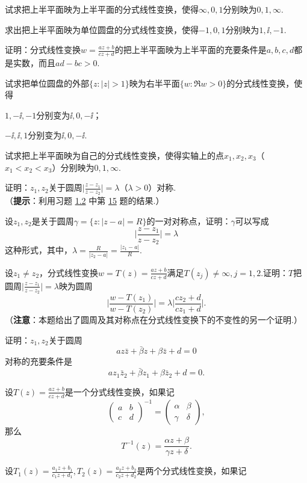 \begin{xiti}
\item 试求把上半平面映为上半平面的分式线性变换，使得$\infty,0,1$分别映为$0,1,\infty$.
\item 求出把上半平面映为单位圆盘的分式线性变换，使得$-1,0,1$分别映为$1,\ii,-1$.
\item 证明：分式线性变换$w=\frac{az+b}{cz+d}$的把上半平面映为上半平面的充要条件是$a,b,c,d$都是实数，而且$ad-bc>0$.
\item 试求把单位圆盘的外部$\{z:|z|>1\}$映为右半平面$\{w:\Re w>0\}$的分式线性变换，使得
\begin{enuma}
  \item $1,-\ii,-1$分别变为$\ii,0,-\ii$；
  \item $-\ii,\ii,1$分别变为$\ii,0,-\ii$.
\end{enuma}
\item 试求把上半平面映为自己的分式线性变换，使得实轴上的点$x_1,x_2,x_3$（$x_1<x_2<x_3$）分别映为$0,1,\infty$.
\item 证明：$z_1,z_2$关于圆周$\bigg|\frac{z-z_1}{z-z_2}\bigg|=\lambda$（$\lambda>0$）对称.\\
（\textbf{提示}：利用习题 \hyperlink{xiti1.2}{1.2} 中第 \hyperlink{xiti1.2.15}{15} 题的结果.）
\item 设$z_1,z_2$是关于圆周$\gamma=\{z:|z-a|=R\}$的一对对称点，证明：$\gamma$可以写成
\[\bigg|\frac{z-z_1}{z-z_2}\bigg|=\lambda\]
这种形式，其中，$\lambda=\frac R{|z_2-a|}=\frac{|z_1-a|}R$.
\item 设$z_1\ne z_2$，分式线性变换$w=T(z)=\frac{az+b}{cz+d}$满足$T(z_j)\ne\infty,j=1,2$.证明：$T$把圆周$\bigg|\frac{z-z_1}{z-z_2}\bigg|=\lambda$映为圆周
    \[\bigg|\frac{w-T(z_1)}{w-T(z_2)}\bigg|=\lambda\bigg|\frac{cz_2+d}{cz_1+d}\bigg|.\]
（\textbf{注意}：本题给出了圆周及其对称点在分式线性变换下的不变性的另一个证明.）
\item 证明：$z_1,z_2$关于圆周
\[az\bar z+\bar \beta z+\beta\bar z+d=0\]
对称的充要条件是
\[az_1\bar z_2+\bar \beta z_1+\beta\bar z_2+d=0.\]
\item 设$T(z)=\frac{az+b}{cz+d}$是一个分式线性变换，如果记
\[\begin{pmatrix}
a&b\\c&d
\end{pmatrix}^{-1}=\begin{pmatrix}
\alpha&\beta\\\gamma&\delta
\end{pmatrix},\]
那么
\[T^{-1}(z)=\frac{\alpha z+\beta}{\gamma z+\delta}.\]
\item 设$T_1(z)=\frac{a_1z+b_1}{c_1z+d_1},T_2(z)=\frac{a_2z+b_2}{c_2z+d_2}$是两个分式线性变换，如果记

\end{xiti}
